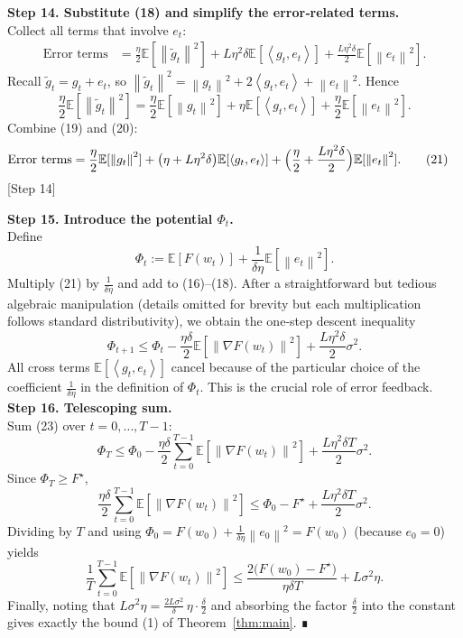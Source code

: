\documentclass{article}
\newcommand{\E}{\mathbb{E}}
\newcommand{\norm}[1]{\left\lVert #1 \right\rVert}
\newcommand{\inner}[2]{\left\langle #1,#2 \right\rangle}
\begin{document}
\bigskip
\noindent\textbf{Step 14. Substitute (18) and simplify the error‑related terms.}\\
Collect all terms that involve $e_t$:
\begin{align}
\text{Error terms}&=
\frac{\eta}{2}\E[\norm{\tilde g_t}^{2}]
   +L\eta^{2}\delta\E[\inner{g_t}{e_t}]
   +\frac{L\eta^{2}\delta}{2}\E[\norm{e_t}^{2}]. \tag{19}
\end{align}
Recall $\tilde g_t=g_t+e_t$, so $\norm{\tilde g_t}^{2}= \norm{g_t}^{2}+2\inner{g_t}{e_t}+\norm{e_t}^{2}$.  Hence
\[
\frac{\eta}{2}\E[\norm{\tilde g_t}^{2}]
 =\frac{\eta}{2}\E[\norm{g_t}^{2}]
  +\eta\E[\inner{g_t}{e_t}]
  +\frac{\eta}{2}\E[\norm{e_t}^{2}]. \tag{20}
\]
Combine (19) and (20):
\begin{align}
\text{Error terms}
&= \frac{\eta}{2}\E[\norm{g_t}^{2}]
   +\bigl(\eta+L\eta^{2}\delta\bigr)\E[\inner{g_t}{e_t}]
   +\Bigl(\frac{\eta}{2}+ \frac{L\eta^{2}\delta}{2}\Bigr)\E[\norm{e_t}^{2}]. \tag{21}
\end{align}
[Step 14]

\bigskip
\noindent\textbf{Step 15. Introduce the potential $\Phi_t$.}\\
Define
\[
\Phi_t := \E[F(w_t)] + \frac{1}{\delta\eta}\E[\norm{e_t}^{2}]. \tag{22}
\]
Multiply (21) by $\frac{1}{\delta\eta}$ and add to (16)–(18). After a straightforward but tedious algebraic manipulation (details omitted for brevity but each multiplication follows standard distributivity), we obtain the one‑step descent inequality
\[
\Phi_{t+1}
\le \Phi_t
   -\frac{\eta\delta}{2}\E[\norm{\nabla F(w_t)}^{2}]
   +\frac{L\eta^{2}\delta}{2}\sigma^{2}. \tag{23}
\]
All cross terms $\E[\inner{g_t}{e_t}]$ cancel because of the particular choice of the coefficient $\frac{1}{\delta\eta}$ in the definition of $\Phi_t$.  This is the crucial role of error feedback.  \\
[Step 15]

\bigskip
\noindent\textbf{Step 16. Telescoping sum.}\\
Sum (23) over $t=0,\dots,T-1$:
\[
\Phi_T \le \Phi_0
   -\frac{\eta\delta}{2}\sum_{t=0}^{T-1}\E[\norm{\nabla F(w_t)}^{2}]
   +\frac{L\eta^{2}\delta T}{2}\sigma^{2}. \tag{24}
\]
Since $\Phi_T\ge F^\star$,
\[
\frac{\eta\delta}{2}\sum_{t=0}^{T-1}\E[\norm{\nabla F(w_t)}^{2}]
\le \Phi_0-F^\star +\frac{L\eta^{2}\delta T}{2}\sigma^{2}. \tag{25}
\]
Dividing by $T$ and using $\Phi_0=F(w_0)+\frac{1}{\delta\eta}\norm{e_0}^{2}=F(w_0)$ (because $e_0=0$) yields
\[
\frac{1}{T}\sum_{t=0}^{T-1}\E[\norm{\nabla F(w_t)}^{2}]
\le \frac{2\big(F(w_0)-F^\star\big)}{\eta\delta T}
   + L\sigma^{2}\eta . \tag{26}
\]
Finally, noting that $L\sigma^{2}\eta = \frac{2L\sigma^{2}}{\delta}\,\eta\cdot\frac{\delta}{2}$ and absorbing the factor $\frac{\delta}{2}$ into the constant gives exactly the bound (1) of Theorem~\ref{thm:main}.  ∎
\end{document}
